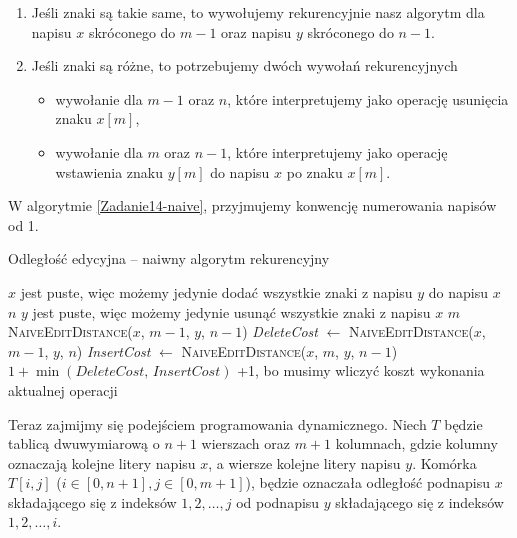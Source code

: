 \begin{enumerate}
	\item Jeśli znaki są takie same, to wywołujemy rekurencyjnie
	nasz algorytm dla napisu $x$ skróconego do $m - 1$ oraz 
	napisu $y$ skróconego do $n - 1$.
	\item Jeśli znaki są różne, to potrzebujemy dwóch wywołań rekurencyjnych
	\begin{itemize}
		\item wywołanie dla $m - 1$ oraz $n$, które interpretujemy jako operację usunięcia znaku $x[m]$,
		\item wywołanie dla $m$ oraz $n - 1$, które
		interpretujemy jako operację wstawienia znaku $y[m]$ do napisu $x$
		po znaku $x[m]$.
	\end{itemize} 
\end{enumerate}

W algorytmie \ref{Zadanie14-naive}, przyjmujemy konwencję numerowania napisów od 1.
\begin{algorithm}[H]
	\caption{Odległość edycyjna -- naiwny algorytm rekurencyjny}
	\begin{algorithmic}[1]
		\Comment $x$ jest puste, więc możemy jedynie dodać wszystkie znaki z napisu $y$ do napisu $x$
		\State \Return $n$ 
		\EndIf
		\Comment $y$ jest puste, więc możemy jedynie usunąć wszystkie znaki z napisu $x$
		\State \Return $m$ 
		\EndIf
		\State \Return \textsc{NaiveEditDistance}($x$, $m - 1$, $y$, $n - 1$)
		\Else
		\State \textit{DeleteCost} $\gets$ \textsc{NaiveEditDistance}($x$, $m - 1$, $y$, $n$)
		\State \textit{InsertCost} $\gets$ \textsc{NaiveEditDistance}($x$, $m$, $y$, $n - 1$)
		\State \Return $1 + \min(\textit{DeleteCost, InsertCost})$ \Comment +1, bo musimy wliczyć koszt wykonania aktualnej operacji
		\EndIf
		\EndProcedure 
	\end{algorithmic}
	\label{Zadanie14-naive}
\end{algorithm}

Teraz zajmijmy się podejściem programowania dynamicznego.
Niech $T$ będzie tablicą dwuwymiarową o
$n + 1$ wierszach oraz $m + 1$ kolumnach,
gdzie kolumny oznaczają kolejne litery napisu $x$, a
wiersze kolejne litery napisu $y$. Komórka
$T[i, j]$ ($i \in [0, n+1], j \in [0, m+1]$), będzie 
oznaczała odległość 
podnapisu $x$ składającego się z indeksów $1,2, \ldots, j$ od 
podnapisu $y$ składającego się z indeksów $1,2, \ldots, i$.

